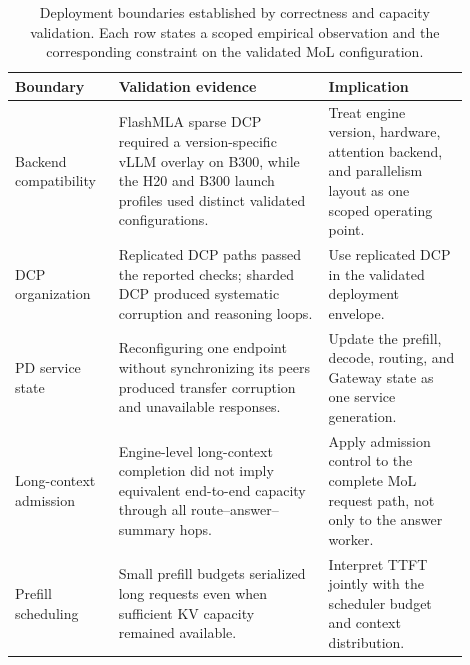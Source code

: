 \begin{table}[H]
\centering
\caption{Deployment boundaries established by correctness and capacity validation. Each row states a scoped empirical observation and the corresponding constraint on the validated MoL configuration.}
\label{tab:mol_deployment_invariants}
\scriptsize
\begin{tabular}{p{0.19\linewidth}p{0.42\linewidth}p{0.29\linewidth}}
\toprule
Boundary & Validation evidence & Implication \\
\midrule
Backend compatibility & FlashMLA sparse DCP required a version-specific vLLM overlay on B300, while the H20 and B300 launch profiles used distinct validated configurations. & Treat engine version, hardware, attention backend, and parallelism layout as one scoped operating point. \\
DCP organization & Replicated DCP paths passed the reported checks; sharded DCP produced systematic corruption and reasoning loops. & Use replicated DCP in the validated deployment envelope. \\
PD service state & Reconfiguring one endpoint without synchronizing its peers produced transfer corruption and unavailable responses. & Update the prefill, decode, routing, and Gateway state as one service generation. \\
Long-context admission & Engine-level long-context completion did not imply equivalent end-to-end capacity through all route--answer--summary hops. & Apply admission control to the complete MoL request path, not only to the answer worker. \\
Prefill scheduling & Small prefill budgets serialized long requests even when sufficient KV capacity remained available. & Interpret TTFT jointly with the scheduler budget and context distribution. \\
\bottomrule
\end{tabular}
\end{table}
